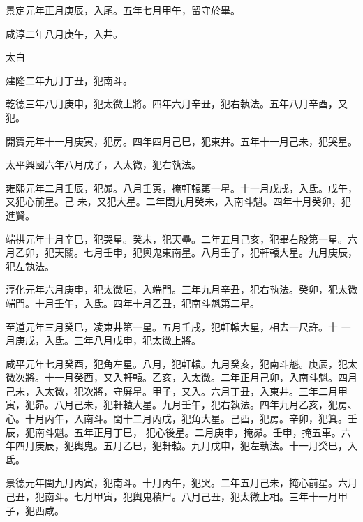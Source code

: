 \begin{pinyinscope}
 景定元年正月庚辰，入尾。五年七月甲午，留守於畢。



 咸淳二年八月庚午，入井。



 太白



 建隆二年九月丁丑，犯南斗。



 乾德三年八月庚申，犯太微上將。四年六月辛丑，犯右執法。五年八月辛酉，又犯。



 開寶元年十一月庚寅，犯房。四年四月己巳，犯東井。五年十一月己未，犯哭星。



 太平興國六年八月戊子，入太微，犯右執法。



 雍熙元年二月壬辰，犯昴。八月壬寅，掩軒轅第一星。十一月戊戌，入氐。戊午，又犯心前星。己
 未，又犯大星。二年閏九月癸未，入南斗魁。四年十月癸卯，犯進賢。



 端拱元年十月辛巳，犯哭星。癸未，犯天壘。二年五月己亥，犯畢右股第一星。六月乙卯，犯天關。七月壬申，犯輿鬼東南星。八月壬子，犯軒轅大星。九月庚辰，犯左執法。



 淳化元年六月庚申，犯太微垣，入端門。三年九月辛丑，犯右執法。癸卯，犯太微端門。十月壬午，入氐。四年十月乙丑，犯南斗魁第二星。



 至道元年三月癸巳，凌東井第一星。五月壬戌，犯軒轅大星，相去一尺許。十
 一月庚戌，入氐。三年八月戊申，犯太微上將。



 咸平元年七月癸酉，犯角左星。八月，犯軒轅。九月癸亥，犯南斗魁。庚辰，犯太微次將。十一月癸酉，又入軒轅。乙亥，入太微。二年正月己卯，入南斗魁。四月己未，入太微，犯次將，守屏星。甲子，又入。六月丁丑，入東井。三年二月甲寅，犯昴。八月己未，犯軒轅大星。九月壬午，犯右執法。四年九月乙亥，犯房、心。十月丙午，入南斗。閏十二月丙戌，犯角大星。己酉，犯房。辛卯，犯箕。壬辰，犯南斗魁。五年正月丁巳，
 犯心後星。二月庚申，掩昴。壬申，掩五車。六年四月庚辰，犯輿鬼。五月乙巳，犯軒轅。九月戊申，犯左執法。十一月癸巳，入氐。



 景德元年閏九月丙寅，犯南斗。十月丙午，犯哭。二年五月己未，掩心前星。六月己丑，犯南斗。七月甲寅，犯輿鬼積尸。八月己丑，犯太微上相。三年十一月甲子，犯西咸。




\end{pinyinscope}
